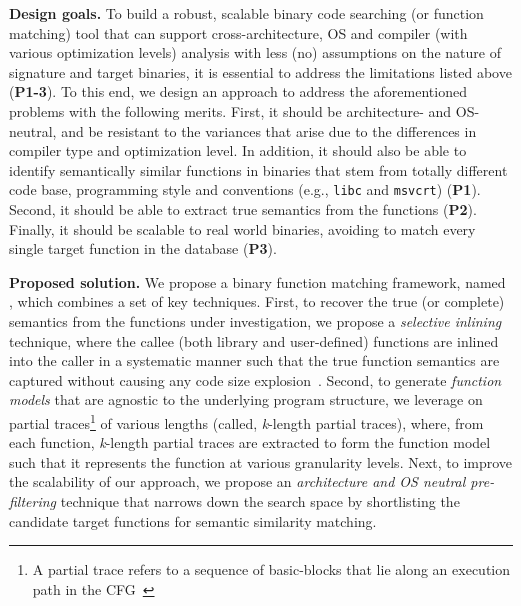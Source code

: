 \noindent\textbf{Design goals.} To build a robust, scalable binary code searching (or function matching) tool that can support cross-architecture, OS and compiler (with various optimization levels) analysis with less (no) assumptions on the nature of signature and target binaries, it is essential to address the limitations listed above (\textbf{P1-3}). To this end, we design an approach to address the aforementioned problems with the following merits. First, it should be architecture- and OS- neutral, and be resistant to the variances that arise due to the differences in compiler type and optimization level. In addition, it should also be able to identify semantically similar functions in binaries that stem from totally different code base, programming style and conventions (e.g., \texttt{libc} and \texttt{msvcrt}) (\textbf{P1}). Second, it should be able to extract true semantics from the functions (\textbf{P2}). Finally, it should be scalable to real world binaries, avoiding to match every single target function in the database (\textbf{P3}).

\noindent\textbf{Proposed solution.} We propose a binary function matching framework, named \tool, which combines a set of key techniques. First, to recover the true (or complete) semantics from the functions under investigation, we propose a \emph{selective inlining} technique, where the callee (both library and user-defined) functions  are inlined into the caller in a systematic manner such that the true function semantics are captured without causing any code size explosion~\cite{wang2015binary}.  Second, to generate \emph{function models} that are agnostic to the underlying program structure, we leverage on partial traces\footnote{A partial trace refers to a sequence of basic-blocks that lie along an execution path in the CFG~\cite{DBLP:conf/pldi/DavidY14}} of various lengths (called, \emph{k}-length partial traces), where, from each function, \emph{k}-length partial traces are extracted to form the function model such that it represents the function at various granularity levels. Next, to improve the scalability of our approach, we propose an \emph{architecture and OS neutral pre-filtering} technique that narrows down the search space by shortlisting the candidate target functions for semantic similarity matching. 

